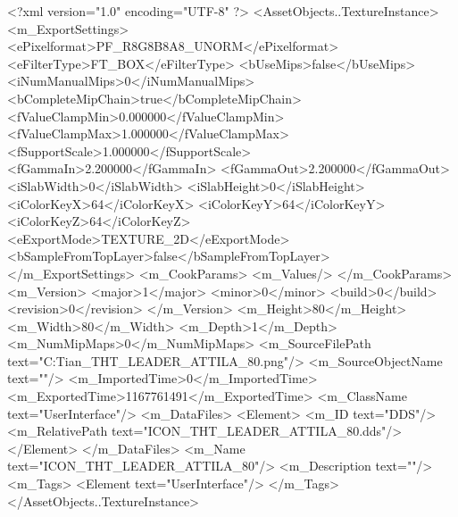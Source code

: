 <?xml version="1.0" encoding="UTF-8" ?>
<AssetObjects..TextureInstance>
	<m_ExportSettings>
		<ePixelformat>PF_R8G8B8A8_UNORM</ePixelformat>
		<eFilterType>FT_BOX</eFilterType>
		<bUseMips>false</bUseMips>
		<iNumManualMips>0</iNumManualMips>
		<bCompleteMipChain>true</bCompleteMipChain>
		<fValueClampMin>0.000000</fValueClampMin>
		<fValueClampMax>1.000000</fValueClampMax>
		<fSupportScale>1.000000</fSupportScale>
		<fGammaIn>2.200000</fGammaIn>
		<fGammaOut>2.200000</fGammaOut>
		<iSlabWidth>0</iSlabWidth>
		<iSlabHeight>0</iSlabHeight>
		<iColorKeyX>64</iColorKeyX>
		<iColorKeyY>64</iColorKeyY>
		<iColorKeyZ>64</iColorKeyZ>
		<eExportMode>TEXTURE_2D</eExportMode>
		<bSampleFromTopLayer>false</bSampleFromTopLayer>
	</m_ExportSettings>
	<m_CookParams>
		<m_Values/>
	</m_CookParams>
	<m_Version>
		<major>1</major>
		<minor>0</minor>
		<build>0</build>
		<revision>0</revision>
	</m_Version>
	<m_Height>80</m_Height>
	<m_Width>80</m_Width>
	<m_Depth>1</m_Depth>
	<m_NumMipMaps>0</m_NumMipMaps>
	<m_SourceFilePath text="C:\Users\Troy Tian\Downloads\ICON_THT_LEADER_ATTILA_80.png"/>
	<m_SourceObjectName text=""/>
	<m_ImportedTime>0</m_ImportedTime>
	<m_ExportedTime>1167761491</m_ExportedTime>
	<m_ClassName text="UserInterface"/>
	<m_DataFiles>
		<Element>
			<m_ID text="DDS"/>
			<m_RelativePath text="ICON_THT_LEADER_ATTILA_80.dds"/>
		</Element>
	</m_DataFiles>
	<m_Name text="ICON_THT_LEADER_ATTILA_80"/>
	<m_Description text=""/>
	<m_Tags>
		<Element text="UserInterface"/>
	</m_Tags>
</AssetObjects..TextureInstance>

